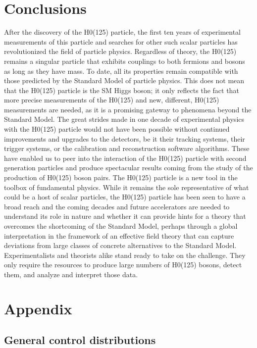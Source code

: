 \documentclass[11pt]{article}
\begin{document}
\section{Conclusions}
\label{sec:org00d6635}
After the discovery of the H0(125) particle, the first ten years of experimental measurements of this particle and searches for
other such scalar particles has revolutionized the field of particle physics.
Regardless of theory, the H0(125) remains a singular particle that exhibits couplings to both fermions and bosons as long as they have mass.
To date, all its properties remain compatible with those predicted by the Standard Model of particle physics.
This does not mean that the H0(125) particle is the SM Higgs boson; it only reflects the fact that more precise measurements
of the H0(125) and new, different, H0(125) measurements are needed, as it is a promising gateway to phenomena beyond the
Standard Model.
The great strides made in one decade of experimental physics with the H0(125) particle would not have been possible without continued improvements and upgrades to the detectors, be it their tracking systems, their trigger systems, or the calibration and reconstruction software algorithms.
These have enabled us to peer into the interaction of the H0(125) particle with second generation particles and produce spectacular results coming from the study of the production of H0(125) boson pairs.
The H0(125) particle is a new tool in the toolbox of fundamental physics.
While it remains the sole representative of what could be a host of scalar particles, the H0(125) particle has been seen to have a broad reach and the coming decades and future accelerators are needed to understand its role in nature and whether it can provide hints for a theory that overcomes the shortcoming of the Standard Model, perhaps through a
global interpretation in the framework of an effective field theory that can capture deviations from large classes of concrete
alternatives to the Standard Model.
Experimentalists and theorists alike stand ready to take on the challenge.
They only require the resources to produce large numbers of H0(125) bosons, detect them, and analyze and interpret those data.
\cite{andre_david_higgs_ten_years}

\section{Appendix}
\label{sec:orgc92ff8f}
\subsection{General control distributions}
\label{sec:org67ce8e6}
\end{document}
